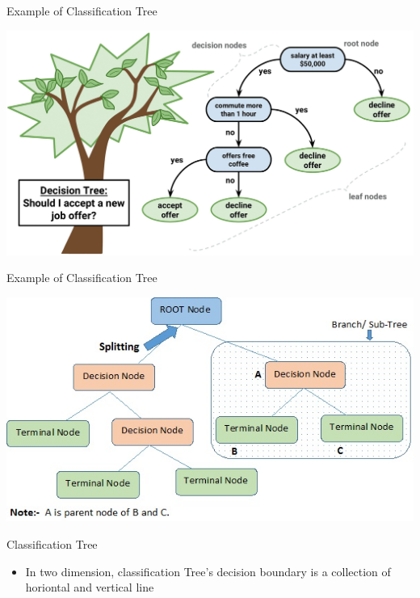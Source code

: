 \documentclass[
  ignorenonframetext,
]{beamer}
\providecommand{\tightlist}{%
  \setlength{\itemsep}{0pt}\setlength{\parskip}{0pt}}
\begin{document}
\begin{frame}{Example of Classification Tree}
\protect\hypertarget{example-of-classification-tree-1}{}

\includegraphics{images2/tree3.jpg}

\end{frame}

\begin{frame}{Example of Classification Tree}
\protect\hypertarget{example-of-classification-tree-2}{}

\includegraphics{images2/tree4.jpg}

\end{frame}

\begin{frame}{Classification Tree}
\protect\hypertarget{classification-tree}{}

\begin{itemize}
\tightlist
\item
  In two dimension, classification Tree's decision boundary is a
  collection of horiontal and vertical line
\end{itemize}

\end{frame}
\end{document}
